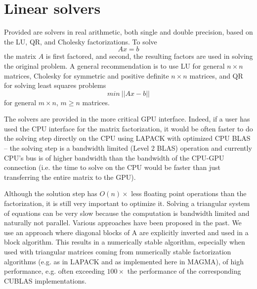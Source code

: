 \documentclass[10pt]{book}
\begin{document}
\normalsize
\newpage
\section{Linear solvers}
\vspace{0.1in}
Provided are solvers in real arithmetic, both single and double precision,
based on the LU, QR, and Cholesky factorizations. To solve
\[
   A x = b
\]
the matrix $A$ is first factored, and second, the resulting factors are used
in solving the original problem. A general recommendation is to use
LU for general $n \times n$ matrices, Cholesky for symmetric and positive
definite $n \times n$ matrices, and QR for solving least squares problems
\[
   min ~|| A x - b ||
\]
for general $m \times n$, $m \ge n$ matrices.

\vspace{0.1in}
The solvers are provided in the more critical GPU interface.
Indeed, if a user has used the CPU interface for the matrix
factorization, it would be often faster to do the solving step 
directly on the CPU using LAPACK with optimized CPU BLAS -- 
the solving step is a bandwidth limited (Level 2 BLAS) operation and 
currently CPU's bus is of higher bandwidth than the bandwidth of the 
CPU-GPU connection (i.e. the time to solve on the CPU
would be faster than just transferring the entire matrix to the GPU). 
 
\vspace{0.1in}
Although the solution step has $O(n) \times$ less floating point operations 
than the factorization, it is still very important to optimize it.
Solving a triangular system of equations can be very slow because 
the computation is bandwidth limited and naturally not parallel.
Various approaches have been proposed in the past. We use an approach 
where diagonal blocks of A are explicitly inverted and used in a block
algorithm. This results in a numerically stable algorithm, especially when 
used with triangular matrices coming from numerically stable factorization
algorithms (e.g. as in LAPACK and as implemented here in MAGMA), of high 
performance, e.g. often exceeding $100 \times$ the performance of the 
corresponding CUBLAS implementations.
\end{document}
